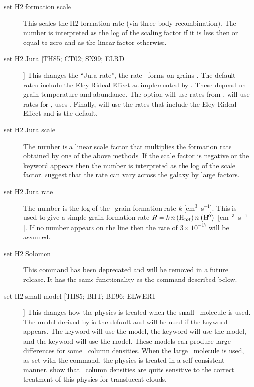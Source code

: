 \begin{description}
\item[set H2 formation scale]  This scales the H2 formation rate
(via three-body recombination). The number is
interpreted as the log of the scaling factor if it is less then or equal to zero
and as the linear factor otherwise.

\item[set H2 Jura [TH85; CT02; SN99; ELRD]]  This changes the ``Jura rate'', the rate
\htwo\ forms on grains \citep{Jura1975}.
The default  rates  include the
Eley-Rideal Effect \citep{LeBourlot12, Rollig13} as implemented by
\citet{Rollig13}.
These depend on grain temperature and abundance.
The option  will use rates from \citet{Tielens1985a},   
will use rates for \citet{Sternberg1999},   uses \citet{Cazaux2002}.
Finally,  will use the rates that include the
Eley-Rideal Effect \citep{LeBourlot12, Rollig13} and is the default.

\item[set H2 Jura scale]   The number is a linear scale factor that
multiplies the formation rate obtained by one of the above methods.  If
the scale factor is negative or the keyword  appears then the number
is interpreted as the log of the scale factor.
\citet{Habart2004} suggest
that the rate can vary across the galaxy by large factors.

\item[set H2 Jura rate]  The number is the log of the \htwo\ grain
formation rate $k$ [cm$^3$~s$^{-1}$].  This is used to give a simple grain formation
rate $R = k\,n\left( {{\mathrm{H}}_{tot} } \right)n\left( {\mbox{{\rm H}$^0$} } \right)$
 [cm$^{-3}$~s$^{-1}$].  If no number appears on the line then the \citet{Jura1975} rate
of $3 \times 10^{-17}$ will be assumed.

\item[set H2 Solomon]  This command has been deprecated and will be removed in a future
  release. It has the same functionality as the  command
  described below.

\item[set H2 small model [TH85; BHT; BD96; ELWERT]]  This changes how the physics
is treated when the small \htwo\ molecule is used.  The model
derived by \citet{Elwert2006} is the default and will be used if
the keyword  appears.  The keyword  will use the \citet{Tielens1985a} model,
the keyword  will use the \citet{Burton1990} model, and the keyword  will use the
\citet{Bertoldi1996} model.
These models can produce large differences for some \htwo\ column densities.  When the large
\htwo\ molecule is used, as set with the  command,
the 
physics is treated in a self-consistent manner.
\citet{Abel2004} show
that \htwo\ column densities are quite sensitive to the correct
treatment of this physics for translucent clouds.


\end{description}
